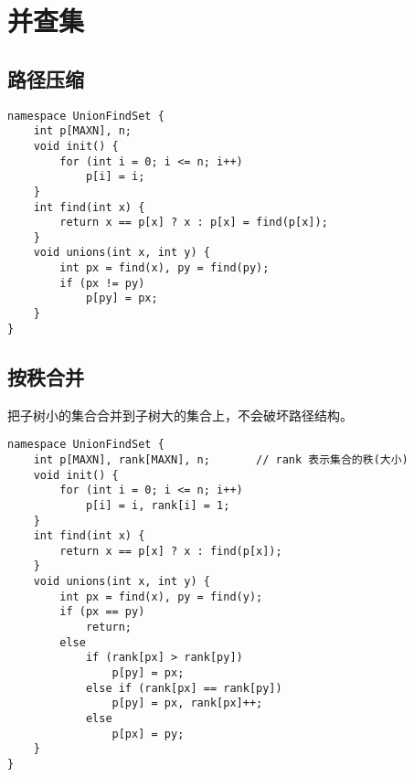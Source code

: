\section{并查集}

\subsection{路径压缩}
\begin{verbatim}
namespace UnionFindSet {
    int p[MAXN], n;
    void init() {
        for (int i = 0; i <= n; i++)
            p[i] = i;
    }
    int find(int x) {
        return x == p[x] ? x : p[x] = find(p[x]);
    }
    void unions(int x, int y) {
        int px = find(x), py = find(py);
        if (px != py)
            p[py] = px;
    }
}
\end{verbatim}

\subsection {按秩合并}
\par 把子树小的集合合并到子树大的集合上，不会破坏路径结构。
\begin{verbatim}
namespace UnionFindSet {
    int p[MAXN], rank[MAXN], n;       // rank 表示集合的秩(大小)
    void init() {
        for (int i = 0; i <= n; i++)
            p[i] = i, rank[i] = 1;
    }
    int find(int x) {
        return x == p[x] ? x : find(p[x]);
    }
    void unions(int x, int y) {
        int px = find(x), py = find(y);
        if (px == py)
            return;
        else
            if (rank[px] > rank[py])
                p[py] = px;
            else if (rank[px] == rank[py])
                p[py] = px, rank[px]++;
            else
                p[px] = py;
    }
}
\end{verbatim}